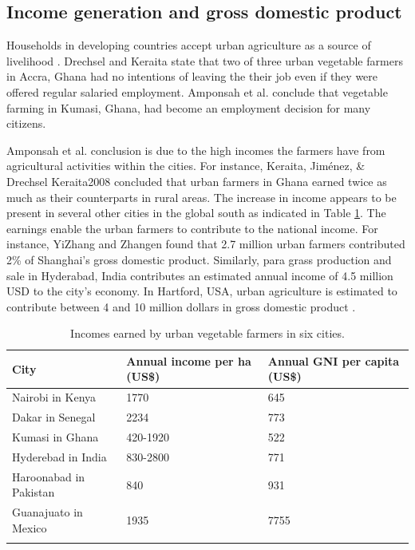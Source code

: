 \subsection{Income generation and gross domestic product}

Households in developing countries accept urban agriculture as a source of livelihood \cite {Amoah2007}. Drechsel and Keraita \cite{Drechsel2014} state that two of three urban vegetable farmers in Accra, Ghana had no intentions of leaving the their job even if they were offered regular salaried employment. Amponsah et al. \cite{Amponsah2015} conclude that vegetable farming in Kumasi, Ghana, had become an employment decision for many citizens.

Amponsah et al. \cite{Amponsah2015} conclusion is due to the high incomes the farmers have from agricultural activities within the cities. For instance, Keraita, Jiménez, \& Drechsel Keraita2008 concluded that urban farmers in Ghana earned twice as much as their counterparts in rural areas. The increase in income appears to be present in several other cities in the global south as indicated in Table \ref{tbl:incomesByUfarmens}. The earnings enable the urban farmers to contribute to the national income. For instance, YiZhang and Zhangen \cite{YiZhang2000} found that 2.7 million urban farmers contributed 2\% of Shanghai's gross domestic product. Similarly, para grass production and sale in Hyderabad, India contributes an estimated annual income of 4.5 million USD to the city's economy. In Hartford, USA, urban agriculture is estimated to contribute between 4 and 10 million dollars in gross domestic product \cite{Nugent2000}.

\begin{table}[th]
\caption{Incomes earned by urban vegetable farmers in six cities. \cite{Keraita2008, Drechsel2014, Buechler2005}}
\begin{center}
\begin{tabular}{ p{} p{} p{} } 
\hline
City & Annual income per ha (US\$) & Annual GNI per capita (US\$) \\
\hline
Nairobi in Kenya & 1770 & 645 \\
Dakar in Senegal & 2234 & 773 \\
Kumasi in Ghana & 420-1920 & 522 \\
Hyderebad in India & 830-2800 & 771 \\
Haroonabad in Pakistan & 840 & 931 \\
Guanajuato in Mexico & 1935 & 7755 \\
\hline
\label{tbl:incomesByUfarmens}
\end{tabular}
\end{center}
\end{table}

